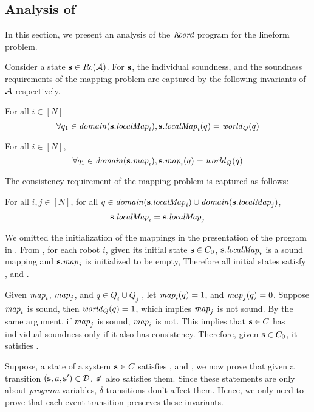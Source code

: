 

\subsection{Analysis of \dmap}
\label{sec:analysis}


In this section, we present an analysis of the $\emph{K\kern-2pt oord}$ program for the lineform problem.


Consider a state ${\textbf{s}}\in \mathit{Rc}(\mathcal{A})$. For ${\textbf{s}}$, the individual soundness, and the soundness requirements of the mapping problem are captured by the following invariants of $\mathcal{A}$ respectively.


\begin{invariant}
\label{ind-sound}
For all $i \in [N]$ $$\forall q_1 \in \mathit{domain}({\textbf{s}}.\mathit{localMap}_i) , {\textbf{s}}.\mathit{localMap}_i(q) =  \mathit{world}_Q(q)$$
\end{invariant}

\begin{invariant}
\label{sound}
For all $i \in [N]$, $$\forall q_1 \in \mathit{domain}({\textbf{s}}.\mathit{map}_i) , {\textbf{s}}.\mathit{map}_i(q) =  \mathit{world}_Q(q)$$
\end{invariant}

The consistency requirement of the mapping problem is captured as follows:
\begin{invariant}
\label{consistency}
For all $i,j \in [N]$, for all $q \in \mathit{domain}({\textbf{s}}.\mathit{localMap}_i)\cup \mathit{domain}({\textbf{s}}.\mathit{localMap}_j)$, $${\textbf{s}}.\mathit{localMap}_i = {\textbf{s}}.\mathit{localMap}_j$$
\end{invariant}

We omitted the initialization of the mappings in the presentation of the program in . From , for each robot $i$, given its initial state ${\textbf{s}}\in C_0$, ${\textbf{s}}.\mathit{localMap}_i$ is a sound mapping and ${\textbf{s}}.\mathit{map}_j$ is initialized to be empty, Therefore all initial states satisfy , and .


Given $\mathit{map}_i$, $\mathit{map}_j$, and $q\in Q_i \cup Q_j$ , let $\mathit{map}_i(q) = 1$, and $\mathit{map}_j(q) = 0$. Suppose $\mathit{map}_i$ is sound, then $\mathit{world}_Q(q) = 1$, which implies $\mathit{map}_j$ is not sound. By the same argument, if $\mathit{map}_j$ is sound, $\mathit{map}_i$ is not. This implies that ${\textbf{s}}\in C$ has individual soundness only if it also has consistency. Therefore, given ${\textbf{s}}\in C_0$, it satisfies .

Suppose, a state of a system ${\textbf{s}}\in C$ satisfies ,  and  , we now prove that given a transition $({\textbf{s}}, a, {\textbf{s}}')\in \mathcal{D}$, ${\textbf{s}}'$ also satisfies them. Since these statements are only about \emph{program} variables, $\delta$-transitions don't affect them. Hence, we only need to prove that each event transition preserves these invariants.

